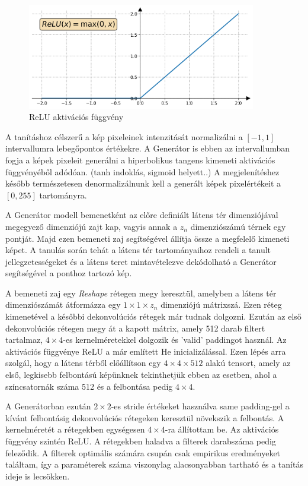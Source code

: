 \begin{figure}[h]
\centering
\includegraphics[width=10cm]{images/relu.png}
\caption{ReLU aktivációs függvény}
\label{fig:relu}
\end{figure}

A tanításhoz célszerű a kép pixeleinek intenzitását normalizálni a $[-1, 1]$ intervallumra lebegőpontos értékekre. A Generátor is ebben az intervallumban fogja a képek pixeleit generálni a hiperbolikus tangens kimeneti aktivációs függvényéből adódóan. (tanh indoklás, sigmoid helyett..) A megjelenítéshez később természetesen denormalizálnunk kell a generált képek pixelértékeit a $[0, 255]$ tartományra.

A Generátor modell bemenetként az előre definiált látens tér dimenziójával megegyező dimenziójú zajt kap, vagyis annak a $z_n$ dimenziószámú térnek egy pontját. Majd ezen bemeneti zaj segítségével állítja össze a megfelelő kimeneti képet. A tanulás során tehát a látens tér tartományaihoz rendeli a tanult jellegzetességeket és a látens teret mintavételezve dekódolható a Generátor segítségével a ponthoz tartozó kép.

A bemeneti zaj egy \textit{Reshape} rétegen megy keresztül, amelyben a látens tér dimenziószámát átformázza egy $1 \times 1 \times z_n$ dimenziójú mátrixszá. Ezen réteg kimenetével a későbbi dekonvolúciós rétegek már tudnak dolgozni.
Ezután az első dekonvolúciós rétegen megy át a kapott mátrix, amely 512 darab filtert tartalmaz, $4 \times 4$-es kernelméretekkel dolgozik és 'valid' paddingot használ. Az aktivációs függvénye ReLU a már említett He inicializálással. Ezen lépés arra szolgál, hogy a látens térből előállítson egy $4 \times 4 \times 512$ alakú tensort, amely az első, legkisebb felbontású képünknek tekinthetjük ebben az esetben, ahol a színcsatornák száma 512 és a felbontása pedig $4 \times 4$.

A Generátorban ezután $2 \times 2$-es stride értékeket használva same padding-gel a kívánt felbontásig dekonvolúciós rétegeken keresztül növekszik a felbontás. A kernelméretét a rétegekben egységesen $4 \times 4$-ra állítottam be. Az aktivációs függvény szintén ReLU. A rétegekben haladva a filterek darabszáma pedig feleződik. A filterek optimális számára csupán csak empirikus eredményeket találtam, így a paraméterek száma viszonylag alacsonyabban tartható és a tanítás ideje is lecsökken.

